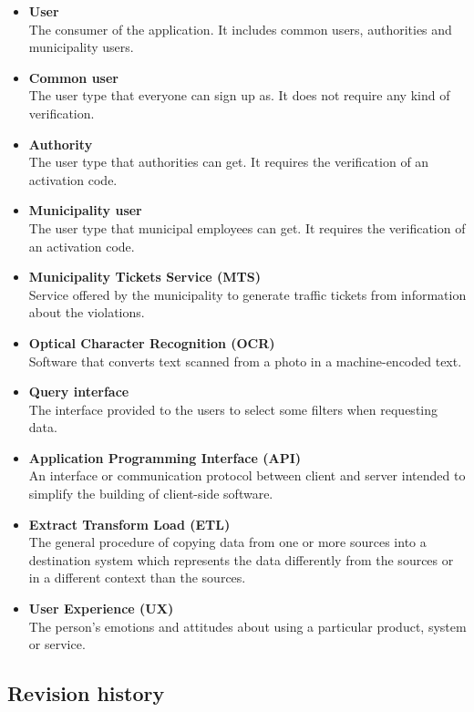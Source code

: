 \documentclass[./main.tex]{subfiles}
\begin{document}
\begin{itemize}
\item
  \textbf{User}\\
  The consumer of the application. It includes common users, authorities
  and municipality users.
\item
  \textbf{Common user}\\
  The user type that everyone can sign up as. It does not require any
  kind of verification.
\item
  \textbf{Authority}\\
  The user type that authorities can get. It requires the verification
  of an activation code.
\item
  \textbf{Municipality user}\\
  The user type that municipal employees can get. It requires the
  verification of an activation code.
\item
  \textbf{Municipality Tickets Service (MTS)}\\
  Service offered by the municipality to generate traffic tickets from
  information about the violations.
\item
  \textbf{Optical Character Recognition (OCR)}\\
  Software that converts text scanned from a photo in a machine-encoded
  text.
\item
  \textbf{Query interface}\\
  The interface provided to the users to select some filters when
  requesting data.
\item
  \textbf{Application Programming Interface (API)}\\
  An interface or communication protocol between client and server
  intended to simplify the building of client-side software.
\item
  \textbf{Extract Transform Load (ETL)}\\
  The general procedure of copying data from one or more sources into a
  destination system which represents the data differently from the
  sources or in a different context than the sources.
\item
  \textbf{User Experience (UX)}\\
  The person's emotions and attitudes about using a particular product, system
  or service.
\end{itemize}

\subsection{Revision history}
\end{document}
